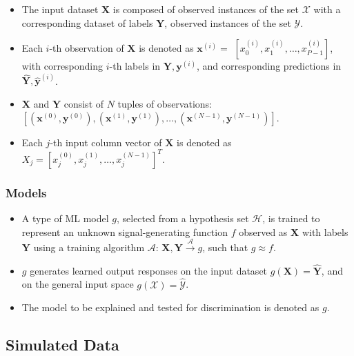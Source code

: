 \documentclass[information,article,submit,moreauthors,pdftex]{definitions/mdpi}
\begin{document}
	\begin{itemize}[leftmargin=*,labelsep=5.8mm]
		\item The input dataset $\mathbf{X}$ is composed of observed instances of the set $\mathcal{X}$ with a corresponding dataset of labels $\mathbf{Y}$, observed instances of the set $\mathcal{Y}$. 
		\item Each $i$-th observation of $\mathbf{X}$ is denoted as $\mathbf{x}^{(i)} = $  
		$[x_0^{(i)}, x_1^{(i)}, \dots, x_{\textit{P}-1}^{(i)}]$, with corresponding $i$-th labels in $\mathbf{Y}, \mathbf{y}^{(i)}$, and corresponding predictions in $\mathbf{\hat{Y}}, \mathbf{\hat{y}}^{(i)}$. %
		\item $\mathbf{X}$ and $\mathbf{Y}$ consist of $N$ tuples of observations: $[(\mathbf{x}^{(0)},\mathbf{y}^{(0)}), (\mathbf{x}^{(1)},\mathbf{y}^{(1)}), \dots,(\mathbf{x}^{(N-1)},\mathbf{y}^{(N-1)})]$. %
		\item Each $j$-th input column vector of $\mathbf{X}$ is denoted as $X_j = [x_{j}^{(0)}, x_{j}^{(1)}, \dots, x_{j}^{(N-1)}]^T$.
	\end{itemize}	 

\subsubsection{Models}

	\begin{itemize}[leftmargin=*,labelsep=5.8mm]
		\item A type of ML model $g$, selected from a hypothesis set $\mathcal{H}$, is trained to represent an unknown signal-generating function $f$ observed as  $\mathbf{X}$ with labels $\mathbf{Y}$ using a training algorithm $\mathcal{A}$: 
		$ \mathbf{X}, \mathbf{Y} \xrightarrow{\mathcal{A}} g$, such that $g \approx f$.
		\item $g$ generates learned output responses on the input dataset $g(\mathbf{X}) = \mathbf{\hat{Y}}$, and on the general input space $g(\mathcal{X}) = \mathcal{\hat{Y}}$.
		\item The model to be explained and tested for discrimination is denoted as $g$.
	\end{itemize}

\subsection{Simulated Data}\label{ssec:sim_data}
\end{document}
